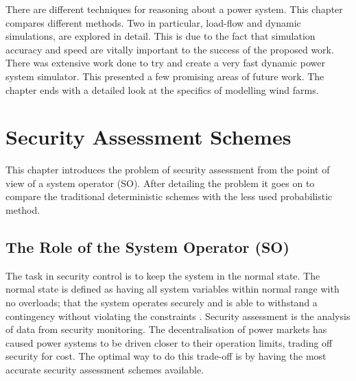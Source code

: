 \documentclass[a4paper,oneside,12pt]{report}
\begin{document}
There are different techniques for reasoning about a power system. This chapter compares different methods. Two in particular, load-flow and dynamic simulations, are explored in detail. This is due to the fact that simulation accuracy and speed are vitally important to the success of the proposed work. There was extensive work done to try and create a very fast dynamic power system simulator. This presented a few promising areas of future work. The chapter ends with a detailed look at the specifics of modelling wind farms.














\chapter{Security Assessment Schemes}\label{lbl_ch_SAS}

This chapter introduces the problem of security assessment from the point of view of a system operator (SO). After detailing the problem it goes on to compare the traditional deterministic schemes with the less used probabilistic method.

\section{The Role of the System Operator (SO)}\label{lbl_sec_so}

The task in security control is to keep the system in the normal state. The normal state is defined as having all system variables within normal range with no overloads; that the system operates securely and is able to withstand a contingency without violating the constraints \cite{Kundur1994}. Security assessment is the analysis of data from security monitoring. The decentralisation of power markets has caused power systems to be driven closer to their operation limits, trading off security for cost. The optimal way to do this trade-off is by having the most accurate security assessment schemes available.
\end{document}
